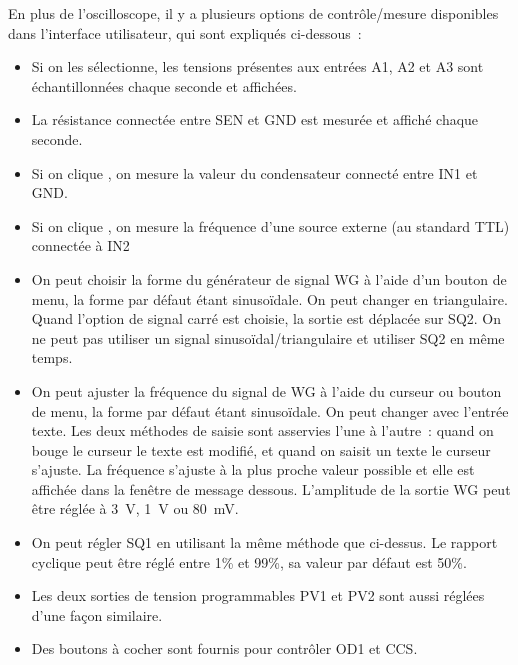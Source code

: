 \documentclass[a4paper,12pt,french]{sphinxmanual}
\begin{document}
En plus de l’oscilloscope, il y a plusieurs options de contrôle/mesure
disponibles dans l’interface utilisateur, qui sont expliqués ci-dessous :
\begin{itemize}
\item {} 
Si on les sélectionne, les tensions présentes aux entrées A1, A2 et
A3 sont échantillonnées chaque seconde et affichées.

\item {} 
La résistance connectée entre SEN et GND est mesurée et affiché chaque
seconde.

\item {} 
Si on clique , on mesure la valeur du condensateur
connecté entre IN1 et GND.

\item {} 
Si on clique , on mesure la fréquence d’une
source externe (au standard TTL) connectée à IN2

\item {} 
On peut choisir la forme du générateur de signal WG à l’aide d’un
bouton de menu, la forme par défaut étant sinusoïdale. On peut
changer en triangulaire. Quand l’option de signal carré est
choisie, la sortie est déplacée sur SQ2. On ne peut pas utiliser
un signal sinusoïdal/triangulaire et utiliser SQ2 en même temps.

\item {} 
On peut ajuster la fréquence du signal de WG à l’aide du curseur ou
bouton de menu, la forme par défaut étant sinusoïdale. On peut changer
avec l’entrée texte. Les deux méthodes de saisie sont asservies l’une
à l’autre : quand on bouge le curseur le texte est modifié, et quand
on saisit un texte le curseur s’ajuste. La fréquence s’ajuste à la
plus proche valeur possible et elle est affichée dans la fenêtre de
message dessous. L’amplitude de la sortie WG peut être réglée à 3 V,
1 V ou 80 mV.

\item {} 
On peut régler SQ1 en utilisant la même méthode que ci-dessus. Le
rapport cyclique peut être réglé entre 1\% et 99\%, sa valeur par
défaut est 50\%.

\item {} 
Les deux sorties de tension programmables PV1 et PV2 sont aussi réglées
d’une façon similaire.

\item {} 
Des boutons à cocher sont fournis pour contrôler OD1 et CCS.

\end{itemize}
\end{document}
